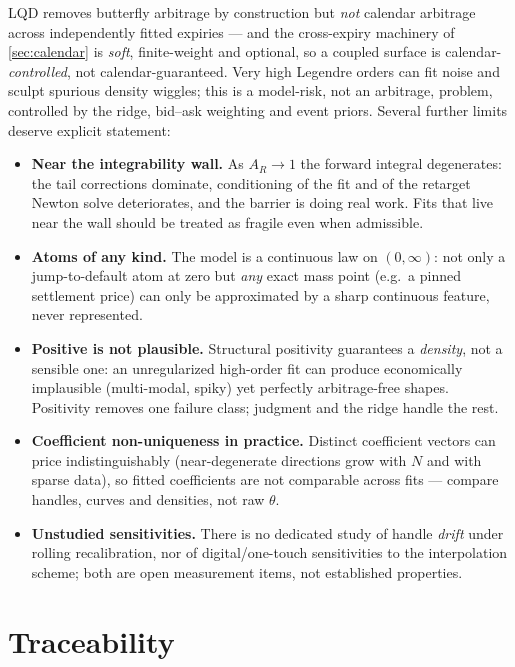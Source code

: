 \documentclass[11pt]{article}
\begin{document}
LQD removes butterfly arbitrage by construction but \emph{not} calendar
arbitrage across independently fitted expiries --- and the cross-expiry
machinery of \cref{sec:calendar} is \emph{soft}, finite-weight and optional,
so a coupled surface is calendar-\emph{controlled}, not calendar-guaranteed.
Very high Legendre orders can fit noise and sculpt spurious density wiggles;
this is a model-risk, not an arbitrage, problem, controlled by the ridge,
bid--ask weighting and event priors. Several further limits deserve explicit
statement:
\begin{itemize}[leftmargin=1.4em]
\item \textbf{Near the integrability wall.} As $A_R\to1$ the forward integral
degenerates: the tail corrections dominate, conditioning of the fit and of the
retarget Newton solve deteriorates, and the barrier is doing real work. Fits
that live near the wall should be treated as fragile even when admissible.
\item \textbf{Atoms of any kind.} The model is a continuous law on
$(0,\infty)$: not only a jump-to-default atom at zero but \emph{any} exact
mass point (e.g.\ a pinned settlement price) can only be approximated by a
sharp continuous feature, never represented.
\item \textbf{Positive is not plausible.} Structural positivity guarantees a
\emph{density}, not a sensible one: an unregularized high-order fit can
produce economically implausible (multi-modal, spiky) yet perfectly
arbitrage-free shapes. Positivity removes one failure class; judgment and the
ridge handle the rest.
\item \textbf{Coefficient non-uniqueness in practice.} Distinct coefficient
vectors can price indistinguishably (near-degenerate directions grow with $N$
and with sparse data), so fitted coefficients are not comparable across fits
--- compare handles, curves and densities, not raw $\theta$.
\item \textbf{Unstudied sensitivities.} There is no dedicated study of
handle \emph{drift} under rolling recalibration, nor of digital/one-touch
sensitivities to the interpolation scheme; both are open measurement items,
not established properties.
\end{itemize}

\section{Traceability}
\label{sec:traceability}
\end{document}
